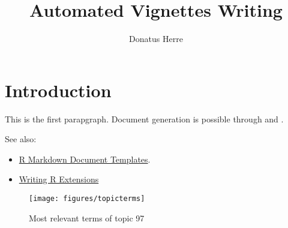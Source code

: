 \documentclass[fontsize=12pt,
               paper=a4,
               headings=small,
               headsepline=on,
               twoside=false,
               parskip=half,
               listof=ignorechapter,
               listof=entryprefix
               ]{scrreprt}
\title{Automated Vignettes Writing}
\subtitle{}
\author{Donatus Herre}
\providecommand{\tightlist}{%
\setlength{\itemsep}{0pt}\setlength{\parskip}{0pt}}
\begin{document}


\maketitle


\newpage
\begingroup
\clearpage
{}
\hypersetup{linkcolor=black}
\renewcommand*{\chapterpagestyle}{empty}
\setcounter{tocdepth}{2}
\tableofcontents
\endgroup


\newpage
{}
\renewcommand\thefigure{\arabic{figure}}
\renewcommand\thetable{\arabic{table}}
\renewcommand{\theequation}{\arabic{equation}}
\frenchspacing

\chapter{Introduction}\label{introduction}

This is the first parapgraph. Document generation is possible through
\textcite{Xie2016} and \textcite{Xie2019}.

See also:

\begin{itemize}
\tightlist
\item
  \href{https://rstudio.github.io/rstudio-extensions/rmarkdown_templates.html}{R
  Markdown Document Templates}.
\item
  \href{https://cran.r-project.org/doc/manuals/r-release/R-exts.html}{Writing
  R Extensions}
\end{itemize}

\pagebreak

\begin{figure}[H]
\texttt{[image: figures/topicterms]} \caption{\label{fig:topic97}Most relevant terms of topic 97}\label{fig:t-97}
\end{figure}

\nocite{*}

\pagebreak

\singlespacing

\printbibliography[title=Sources,heading=bibintoc]
\pagebreak
\end{document}
